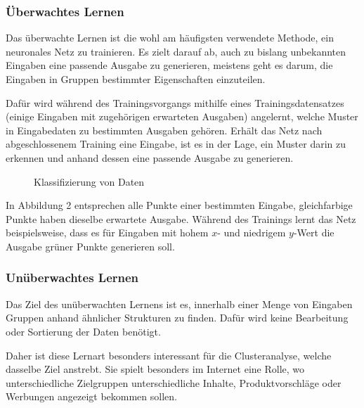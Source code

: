 \documentclass[12pt,a4]{article}
\begin{document}
\subsubsection{Überwachtes Lernen}
Das überwachte Lernen ist die wohl am häufigsten verwendete Methode, ein neuronales Netz zu trainieren. Es zielt darauf ab, auch zu bislang unbekannten Eingaben eine passende Ausgabe zu generieren, meistens geht es darum, die Eingaben in Gruppen bestimmter Eigenschaften einzuteilen. 

Dafür wird während des Trainingsvorgangs mithilfe eines Trainingsdatensatzes (einige Eingaben mit zugehörigen erwarteten Ausgaben) angelernt, welche Muster in Eingabedaten zu bestimmten Ausgaben gehören. Erhält das Netz nach abgeschlossenem Training eine Eingabe, ist es in der Lage, ein Muster darin zu erkennen und anhand dessen eine passende Ausgabe zu generieren.

\begin{figure}[!h]
\centering
{}
\caption{Klassifizierung von Daten}
\end{figure}

In Abbildung 2 entsprechen alle Punkte einer bestimmten Eingabe, gleichfarbige Punkte haben dieselbe erwartete Ausgabe. Während des Trainings lernt das Netz beispielsweise, dass es für Eingaben mit hohem $x$- und niedrigem $y$-Wert die Ausgabe grüner Punkte generieren soll.

\subsubsection{Unüberwachtes Lernen}
Das Ziel des unüberwachten Lernens ist es, innerhalb einer Menge von Eingaben Gruppen anhand ähnlicher Strukturen zu finden. Dafür wird keine Bearbeitung oder Sortierung der Daten benötigt.

Daher ist diese Lernart besonders interessant für die Clusteranalyse, welche dasselbe Ziel anstrebt. Sie spielt besonders im Internet eine Rolle, wo unterschiedliche Zielgruppen unterschiedliche Inhalte, Produktvorschläge oder Werbungen angezeigt bekommen sollen.
\end{document}
